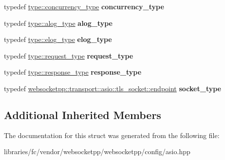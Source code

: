 \begin{DoxyCompactItemize}
\item 
\mbox{\label{structwebsocketpp_1_1config_1_1asio__tls_1_1transport__config_a61a02e8169d3374664360484aa4addb5}} 
typedef \mbox{\hyperlink{classwebsocketpp_1_1concurrency_1_1basic}{type\+::concurrency\+\_\+type}} {\bfseries concurrency\+\_\+type}
\item 
\mbox{\label{structwebsocketpp_1_1config_1_1asio__tls_1_1transport__config_a2ea303b3ffc0ef7eabc7f81f0be96e4f}} 
typedef \mbox{\hyperlink{classwebsocketpp_1_1log_1_1basic}{type\+::alog\+\_\+type}} {\bfseries alog\+\_\+type}
\item 
\mbox{\label{structwebsocketpp_1_1config_1_1asio__tls_1_1transport__config_aa5911130efb47b5ce5e75221d1533156}} 
typedef \mbox{\hyperlink{classwebsocketpp_1_1log_1_1basic}{type\+::elog\+\_\+type}} {\bfseries elog\+\_\+type}
\item 
\mbox{\label{structwebsocketpp_1_1config_1_1asio__tls_1_1transport__config_ae6034f4e1eb1949147e19d148342eec7}} 
typedef \mbox{\hyperlink{classwebsocketpp_1_1http_1_1parser_1_1request}{type\+::request\+\_\+type}} {\bfseries request\+\_\+type}
\item 
\mbox{\label{structwebsocketpp_1_1config_1_1asio__tls_1_1transport__config_a1522be0695a14d9bc31fa6ccdaaf9d4c}} 
typedef \mbox{\hyperlink{classwebsocketpp_1_1http_1_1parser_1_1response}{type\+::response\+\_\+type}} {\bfseries response\+\_\+type}
\item 
\mbox{\label{structwebsocketpp_1_1config_1_1asio__tls_1_1transport__config_a0c1767ea0f1c1f9cc58b3c4827549b1d}} 
typedef \mbox{\hyperlink{classwebsocketpp_1_1transport_1_1asio_1_1tls__socket_1_1endpoint}{websocketpp\+::transport\+::asio\+::tls\+\_\+socket\+::endpoint}} {\bfseries socket\+\_\+type}
\end{DoxyCompactItemize}
\subsection*{Additional Inherited Members}


The documentation for this struct was generated from the following file\+:\begin{DoxyCompactItemize}
\item 
libraries/fc/vendor/websocketpp/websocketpp/config/asio.\+hpp\end{DoxyCompactItemize}
